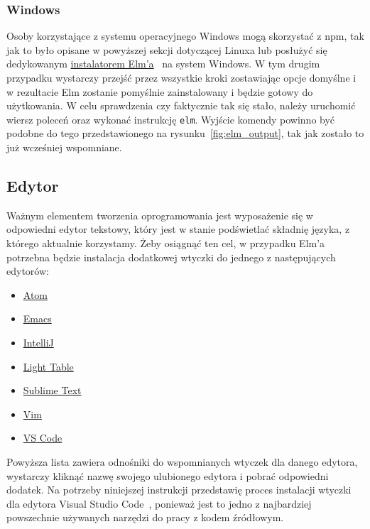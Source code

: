\documentclass[twoside,a4paper]{report}
\begin{document}
\subsubsection{Windows}
Osoby korzystające z systemu operacyjnego Windows mogą skorzystać z npm, tak jak to było opisane w powyższej sekcji dotyczącej Linuxa lub posłużyć się dedykowanym \href{https://github.com/elm/compiler/releases/download/0.19.1/installer-for-windows.exe}{instalatorem Elm'a}~\cite{elm_installer} na system Windows.
W tym drugim przypadku wystarczy przejść przez wszystkie kroki zostawiając opcje domyślne i w rezultacie Elm zostanie pomyślnie zainstalowany i będzie gotowy do użytkowania.
W celu sprawdzenia czy faktycznie tak się stało, należy uruchomić wiersz poleceń oraz wykonać instrukcję \texttt{elm}.
Wyjście komendy powinno być podobne do tego przedstawionego na rysunku~\ref{fig:elm_output}, tak jak zostało to już wcześniej wspomniane.

\subsection{Edytor}
Ważnym elementem tworzenia oprogramowania jest wyposażenie się w odpowiedni edytor tekstowy, który jest w stanie podświetlać składnię języka, z którego aktualnie korzystamy.
Żeby osiągnąć ten cel, w przypadku Elm'a potrzebna będzie instalacja dodatkowej wtyczki do jednego z następujących edytorów:

\begin{itemize}[noitemsep,topsep=0pt]
    \item{\href{https://atom.io/packages/language-elm}{Atom}}
    \item{\href{https://github.com/jcollard/elm-mode}{Emacs}}
    \item{\href{https://github.com/klazuka/intellij-elm}{IntelliJ}}
    \item{\href{https://github.com/rundis/elm-light}{Light Table}}
    \item{\href{https://github.com/evancz/elm-syntax-highlighting/}{Sublime Text}}
    \item{\href{https://github.com/elm-tooling/elm-vim}{Vim}}
    \item{\href{https://github.com/elm-tooling/elm-language-client-vscode}{VS Code}}
\end{itemize}

Powyższa lista zawiera odnośniki do wspomnianych wtyczek dla danego edytora, wystarczy kliknąć nazwę swojego ulubionego edytora i pobrać odpowiedni dodatek.
Na potrzeby niniejszej instrukcji przedstawię proces instalacji wtyczki dla edytora Visual Studio Code~\cite{vscode}, ponieważ jest to jedno z najbardziej powszechnie używanych narzędzi do pracy z kodem źródłowym.
\end{document}
